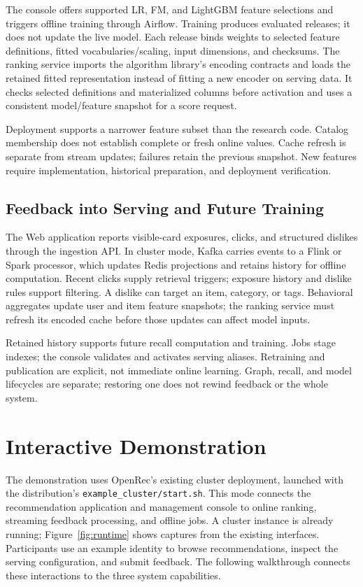 \documentclass[sigconf,screen,review]{acmart}
\begin{document}
The console offers supported LR, FM, and LightGBM feature selections and triggers offline training through Airflow. Training produces evaluated releases; it does not update the live model. Each release binds weights to selected feature definitions, fitted vocabularies/scaling, input dimensions, and checksums. The ranking service imports the algorithm library's encoding contracts and loads the retained fitted representation instead of fitting a new encoder on serving data. It checks selected definitions and materialized columns before activation and uses a consistent model/feature snapshot for a score request.

Deployment supports a narrower feature subset than the research code. Catalog membership does not establish complete or fresh online values. Cache refresh is separate from stream updates; failures retain the previous snapshot. New features require implementation, historical preparation, and deployment verification.

\subsection{Feedback into Serving and Future Training}
The Web application reports visible-card exposures, clicks, and structured dislikes through the ingestion API. In cluster mode, Kafka carries events to a Flink or Spark processor, which updates Redis projections and retains history for offline computation. Recent clicks supply retrieval triggers; exposure history and dislike rules support filtering. A dislike can target an item, category, or tags. Behavioral aggregates update user and item feature snapshots; the ranking service must refresh its encoded cache before those updates can affect model inputs.

Retained history supports future recall computation and training. Jobs stage indexes; the console validates and activates serving aliases. Retraining and publication are explicit, not immediate online learning. Graph, recall, and model lifecycles are separate; restoring one does not rewind feedback or the whole system.

\section{Interactive Demonstration}
The demonstration uses OpenRec's existing cluster deployment, launched with the distribution's \texttt{example\_cluster/start.sh}. This mode connects the recommendation application and management console to online ranking, streaming feedback processing, and offline jobs. A cluster instance is already running; Figure~\ref{fig:runtime} shows captures from the existing interfaces. Participants use an example identity to browse recommendations, inspect the serving configuration, and submit feedback. The following walkthrough connects these interactions to the three system capabilities.
\end{document}
